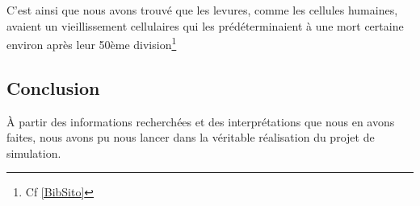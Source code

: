   C'est ainsi que nous avons trouvé que les levures, comme les cellules humaines, avaient un vieillissement cellulaires qui les prédéterminaient à une mort certaine environ après leur 50ème division\footnote{Cf \ref{BibSito}}
  
\subsection{Conclusion}
  À partir des informations recherchées et des interprétations que nous en avons faites, nous avons pu nous lancer dans la véritable réalisation du projet de simulation.

